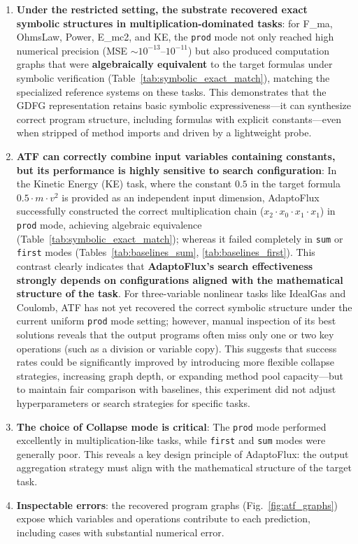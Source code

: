 \begin{enumerate}
    \item \textbf{Under the restricted setting, the substrate recovered exact symbolic structures in multiplication-dominated tasks}: for F\_ma, OhmsLaw, Power, E\_mc2, and KE, the \texttt{prod} mode not only reached high numerical precision (MSE $\sim 10^{-13}$--$10^{-11}$) but also produced computation graphs that were \textbf{algebraically equivalent} to the target formulas under symbolic verification (Table~\ref{tab:symbolic_exact_match}), matching the specialized reference systems on these tasks. This demonstrates that the GDFG representation retains basic symbolic expressiveness---it can synthesize correct program structure, including formulas with explicit constants---even when stripped of method imports and driven by a lightweight probe.
    
    \item \textbf{ATF can correctly combine input variables containing constants, but its performance is highly sensitive to search configuration}: In the Kinetic Energy (KE) task, where the constant $0.5$ in the target formula $0.5 \cdot m \cdot v^2$ is provided as an independent input dimension, AdaptoFlux successfully constructed the correct multiplication chain ($x_2 \cdot x_0 \cdot x_1 \cdot x_1$) in \texttt{prod} mode, achieving algebraic equivalence (Table~\ref{tab:symbolic_exact_match}); whereas it failed completely in \texttt{sum} or \texttt{first} modes (Tables~\ref{tab:baselines_sum}, \ref{tab:baselines_first}). This contrast clearly indicates that \textbf{AdaptoFlux's search effectiveness strongly depends on configurations aligned with the mathematical structure of the task}. For three-variable nonlinear tasks like IdealGas and Coulomb, ATF has not yet recovered the correct symbolic structure under the current uniform \texttt{prod} mode setting; however, manual inspection of its best solutions reveals that the output programs often miss only one or two key operations (such as a division or variable copy). This suggests that success rates could be significantly improved by introducing more flexible collapse strategies, increasing graph depth, or expanding method pool capacity---but to maintain fair comparison with baselines, this experiment did not adjust hyperparameters or search strategies for specific tasks.
    
    \item \textbf{The choice of Collapse mode is critical}: The \texttt{prod} mode performed excellently in multiplication-like tasks, while \texttt{first} and \texttt{sum} modes were generally poor. This reveals a key design principle of AdaptoFlux: the output aggregation strategy must align with the mathematical structure of the target task.
    
    \item \textbf{Inspectable errors}: the recovered program graphs (Fig.~\ref{fig:atf_graphs}) expose which variables and operations contribute to each prediction, including cases with substantial numerical error.
\end{enumerate}

